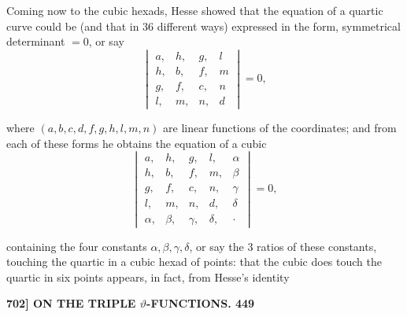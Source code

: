 \documentclass[11pt]{article}
\begin{document}
\medskip

Coming now to the cubic hexads, Hesse showed that the equation of a quartic curve could be (and that in 36 different ways) expressed in the form, symmetrical determinant $= 0$, or say
\[
\begin{vmatrix}
a, & h, & g, & l \\
h, & b, & f, & m \\
g, & f, & c, & n \\
l, & m, & n, & d
\end{vmatrix} = 0,
\]

where $(a, b, c, d, f, g, h, l, m, n)$ are linear functions of the coordinates; and from each of these forms he obtains the equation of a cubic
\[
\begin{vmatrix}
a, & h, & g, & l, & \alpha \\
h, & b, & f, & m, & \beta \\
g, & f, & c, & n, & \gamma \\
l, & m, & n, & d, & \delta \\
\alpha, & \beta, & \gamma, & \delta, & \cdot
\end{vmatrix} = 0,
\]

containing the four constants $\alpha, \beta, \gamma, \delta$, or say the 3 ratios of these constants, touching the quartic in a cubic hexad of points: that the cubic does touch the quartic in six points appears, in fact, from Hesse's identity

\bigskip
\noindent\textbf{702] \quad ON THE TRIPLE $\vartheta$-FUNCTIONS. \hfill 449}

\medskip
\end{document}
